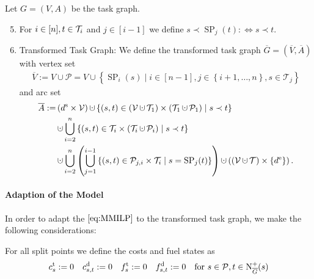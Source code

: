 \begin{definition}
Let $G=(V,A)$ be the task graph.
\begin{enumerate}
	\setcounter{enumi}{4}
	\item{For $i\in[n], t\in\mathcal{T}_i$ and $j\in[i-1]$ we define ${s\prec\operatorname{SP}_j(t):\Leftrightarrow s\prec t}$.}
	\item{Transformed Task Graph: We define the transformed task graph $\overline{G}=\left(\overline{V},\overline{A}\right)$ with vertex set   
		\begin{align*}
			\overline{V} := V\cup \mathcal{P} = V\cup\left\{\operatorname{SP}_i(s)\mid i\in[n-1],j\in\left\{i+1,\dots,n\right\},s\in\mathcal{T}_j\right\}
		\end{align*}
		and arc set
		\begin{align*}
			\overline{A} := & \left(\ds\times\mathcal{V}\right)\cupdot\left\{(s,t)\in\left(\mathcal{V}\cupdot\mathcal{T}_1\right)\times\left( \mathcal{T}_1\cupdot\mathcal{P}_1\right)\mid s\prec t\right\} \\
			& \cupdot\bigcup_{i=2}^n\left\{(s,t)\in\Ti\times\left(\Ti\cupdot \mathcal{P}_i\right)\mid s\prec t\right\} \\
			& \cupdot\bigcup_{i=2}^n\left(\bigcup_{j=1}^{i-1}\left\{(s,t)\in\mathcal{P}_{j,i}\times\Ti\mid s=\operatorname{SP}_j(t)\right\}\right)\cupdot \left(\left(\mathcal{V}\cupdot\mathcal{T}\right)\times\left\{\de\right\}\right).
		\end{align*}}
\end{enumerate}

\end{definition}

\paragraph{Adaption of the Model} \parfill

In order to adapt the $\eqref{eq:MMILP}$ to the transformed task graph, we make the following considerations:

For all split points we define the costs and fuel states as
\begin{align*}
	c^{\operatorname{t}}_s := 0 && c^{\operatorname{d}}_{s,t} := 0 && f^{\operatorname{t}}_s := 0 && f^{\operatorname{d}}_{s,t} := 0 && \text{for } s\in \mathcal{P},t\in\operatorname{N}_{\overline{G}}^+(s)
\end{align*}

